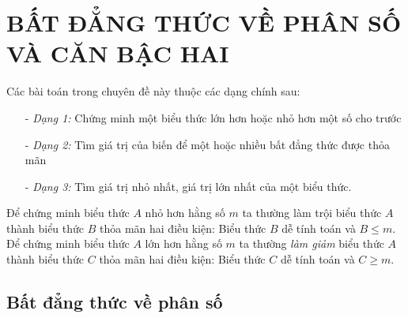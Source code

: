 \section{BẤT ĐẲNG THỨC VỀ PHÂN SỐ VÀ CĂN BẬC HAI}
Các bài toán trong chuyên đề này thuộc các dạng chính sau:
\begin{itemize}
\item[-] \textit{Dạng 1:} Chứng minh một biểu thức lớn hơn hoặc nhỏ hơn một số cho trước
\item[-] \textit{Dạng 2:} Tìm giá trị của biến để một hoặc nhiều bất đẳng thức được thỏa mãn
\item[-] \textit{Dạng 3:} Tìm giá trị nhỏ nhất, giá trị lớn nhất của một biểu thức.
\end{itemize}
Để chứng minh biểu thức $A$ nhỏ hơn hằng số $m$ ta thường làm trội biểu thức $A$ thành biểu thức $B$ thỏa mãn hai điều kiện: Biểu thức $B$ dễ tính toán và $B \leq m.$
Để chứng minh biểu thức $A$ lớn hơn hằng số $m$ ta thường \textit{làm giảm} biểu thức $A$ thành biểu thức $C$ thỏa mãn hai điều kiện: Biểu thức $C$ dễ tính toán và $C \geq m.$
 
\subsection{Bất đẳng thức về phân số}

